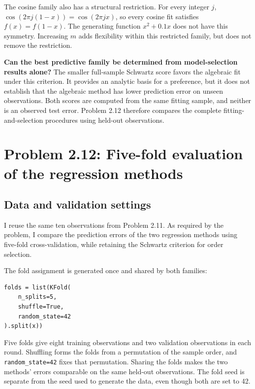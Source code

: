 \documentclass[11pt,a4paper]{article}
\begin{document}
The cosine family also has a structural restriction. For every integer $j$,
$\cos(2\pi j(1-x))=\cos(2\pi jx)$, so every cosine fit satisfies $f(x)=f(1-x)$. The generating function $x^2+0.1x$ does not have this symmetry. Increasing $m$ adds flexibility within this restricted family, but does not remove the restriction.

\textbf{Can the best predictive family be determined from model-selection results alone?} The smaller full-sample Schwartz score favors the algebraic fit under this criterion. It provides an analytic basis for a preference, but it does not establish that the algebraic method has lower prediction error on unseen observations. Both scores are computed from the same fitting sample, and neither is an observed test error. Problem 2.12 therefore compares the complete fitting-and-selection procedures using held-out observations.



\section*{Problem 2.12: Five-fold evaluation of the regression methods}
\subsection*{Data and validation settings}
I reuse the same ten observations from Problem 2.11. As required by the problem, I compare the prediction errors of the two regression methods using five-fold cross-validation, while retaining the Schwartz criterion for order selection.

The fold assignment is generated once and shared by both families:
\par\addvspace{4pt}
\noindent\begin{minipage}{\linewidth}
\begin{lstlisting}[style=pythoncode,caption={Creating one shared set of five validation folds.}]
folds = list(KFold(
    n_splits=5,
    shuffle=True,
    random_state=42
).split(x))
\end{lstlisting}
\end{minipage}\par\addvspace{4pt}
Five folds give eight training observations and two validation observations in each round. Shuffling forms the folds from a permutation of the sample order, and \texttt{random\_state=42} fixes that permutation. Sharing the folds makes the two methods' errors comparable on the same held-out observations. The fold seed is separate from the seed used to generate the data, even though both are set to 42.
\end{document}
